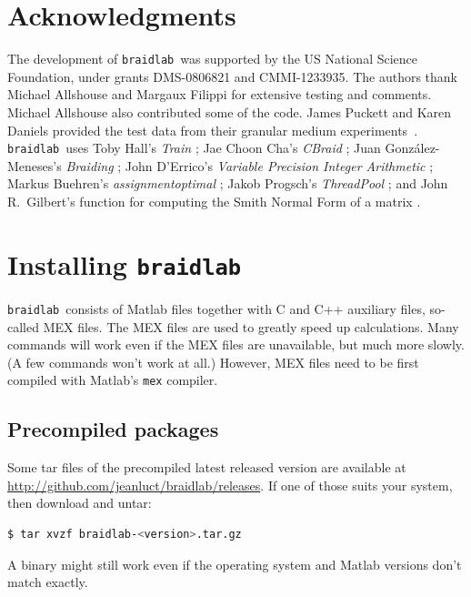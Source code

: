 \documentclass[12pt]{article}
\newcommand{\braidlab}{\texttt{braidlab}}%
\begin{document}
\section*{Acknowledgments}

The development of \braidlab\ was supported by the US National Science
Foundation, under grants DMS-0806821 and CMMI-1233935.  The authors thank
Michael Allshouse and Margaux Filippi for extensive testing and comments.
Michael Allshouse also contributed some of the code.  James Puckett and Karen
Daniels provided the test data from their granular medium
experiments~\citep{Puckett2012}.  \braidlab\ uses Toby Hall's \emph{Train}
\citep{HallTrain}; Jae Choon Cha's \emph{CBraid} \citep{CBraid}; Juan
Gonz\'{a}lez-Meneses's \emph{Braiding} \citep{Braiding}; John D'Errico's
\emph{Variable Precision Integer Arithmetic} \citep{vpi}; Markus Buehren's
\emph{assignmentoptimal} \citep{assignmentoptimal}; Jakob Progsch's
\emph{ThreadPool} \citep{ThreadPool}; and John R.\ Gilbert's function for
computing the Smith Normal Form of a matrix \citep{snf}.


\appendix

\section{Installing \braidlab}
\label{sec:install}
\index{installing \braidlab}

 \braidlab\ consists of Matlab files together with C
and C++ auxiliary files, so-called MEX files.  The MEX files are used to
greatly speed up calculations.  Many commands will work even if the MEX files
are unavailable, but much more slowly.  (A few commands won't work at all.)
However, MEX files need to be first compiled with Matlab's \lstinline{mex}
compiler.  

\subsection{Precompiled packages}
\label{sec:precompiled}

Some tar files of the precompiled latest released version are
available at \url{http://github.com/jeanluct/braidlab/releases}.  If one of
those suits your system, then download and untar:
\begin{lstlisting}[frame=single,framerule=0pt,escapechar=*,%
  language=bash,backgroundcolor=\color{white}]
$ tar xvzf braidlab-<version>.tar.gz
\end{lstlisting}
A binary might still work even if the operating system and Matlab versions
don't match exactly.
\end{document}

